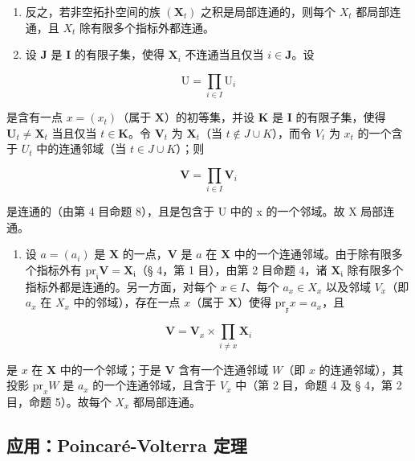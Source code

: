 \begin{enumerate}
\def\labelenumi{\alph{enumi})}
\setcounter{enumi}{1}
\item
  反之，若非空拓扑空间的族 \((\mathbf{X}_{t})\) 之积是局部连通的，则每个 \(X_{t}\) 都局部连通，且 \(X_{t}\) 除有限多个指标外都连通。
\item
  设 \(\mathbf{J}\) 是 \(\mathbf{I}\) 的有限子集，使得 \(\mathbf{X}_i\) 不连通当且仅当 \(i \in \mathbf{J}\)。设
\end{enumerate}

\[
\mathrm{U} = \prod_ {i \in I} \mathrm{U} _ {i}
\]

是含有一点 \(x = (x_{t})\)（属于 \(\mathbf{X}\)）的初等集，并设 \(\mathbf{K}\) 是 \(\mathbf{I}\) 的有限子集，使得 \(\mathbf{U}_{t} \neq \mathbf{X}_{t}\) 当且仅当 \(t \in \mathbf{K}\)。令 \(\mathbf{V}_{t}\) 为 \(\mathbf{X}_{t}\)（当 \(t \notin J \cup K\)），而令 \(V_{t}\) 为 \(x_{t}\) 的一个含于 \(U_{t}\) 中的连通邻域（当 \(t \in J \cup K\)）；则

\[
\mathbf {V} = \prod_ {i \in I} \mathbf {V} _ {i}
\]

是连通的（由第 4 目命题 8），且是包含于 U 中的 x 的一个邻域。故 X 局部连通。

\begin{enumerate}
\def\labelenumi{\alph{enumi})}
\setcounter{enumi}{1}
\tightlist
\item
  设 \(a = (a_{i})\) 是 \(\mathbf{X}\) 的一点，\(\mathbf{V}\) 是 \(a\) 在 \(\mathbf{X}\) 中的一个连通邻域。由于除有限多个指标外有 \(\mathrm{pr}_{\mathfrak{i}}\mathbf{V} = \mathbf{X}_{\mathfrak{i}}\)（§ 4，第 1 目），由第 2 目命题 4，诸 \(\mathbf{X}_{\mathfrak{i}}\) 除有限多个指标外都是连通的。另一方面，对每个 \(x \in I\)、每个 \(a_{x} \in X_{x}\) 以及邻域 \(V_{x}\)（即 \(a_{x}\) 在 \(X_{x}\) 中的邻域），存在一点 \(x\)（属于 \(\mathbf{X}\)）使得 \(\mathrm{pr}_{\mathfrak{x}}x = a_{x}\)，且
\end{enumerate}

\[
\mathbf {V} = \mathbf {V} _ {x} \times \prod_ {i \neq x} \mathbf {X} _ {i}
\]

是 \(x\) 在 \(\mathbf{X}\) 中的一个邻域；于是 \(\mathbf{V}\) 含有一个连通邻域 \(W\)（即 \(x\) 的连通邻域），其投影 \(\mathrm{pr}_xW\) 是 \(a_x\) 的一个连通邻域，且含于 \(V_x\) 中（第 2 目，命题 4 及 § 4，第 2 目，命题 5）。故每个 \(X_x\) 都局部连通。

\subsection{应用：Poincaré-Volterra 定理}

